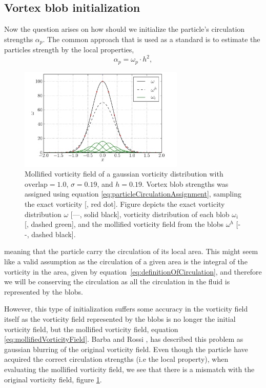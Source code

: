 \subsection{Vortex blob initialization}
\label{subsec:vortexBlobInitialization}
Now the question arises on how should we initialize the particle's circulation strengths $\alpha_p$. The common approach that is used as a standard is to estimate the particles strength by the local properties,
	\begin{equation}
	\alpha_p = \omega_p\cdot h^2,
	\label{eq:particleCirculationAssignment}
	\end{equation}

	\begin{figure}[!b]
	\centering
	\includegraphics[width=0.7\textwidth]{figures/lagrangian/particleInitialization.pdf}
	\caption{Mollified vorticity field of a gaussian vorticity distribution with $\mathrm{overlap}=1.0$, $\sigma=0.19$, and $h=0.19$. Vortex blob strengths was assigned using equation \ref{eq:particleCirculationAssignment}, sampling the exact vorticity [{\color{plotRed}{$\bullet$}}, red dot]. Figure depicts the exact vorticity distribution $\omega$ [---, solid black], vorticity distribution of each blob $\omega_i$ [{\color{darkgreen}{---}}, dashed green], and the mollified vorticity field from the blobs $\omega^h$ [- -, dashed black].  }
	\label{fig:particleInitialization}
	\end{figure}

meaning that the particle carry the circulation of its local area. This might seem like a valid assumption as the circulation of a given area is the integral of the vorticity in the area, given by equation\ \ref{eq:definitionOfCirculation}, and therefore we will be conserving the circulation as all the circulation in the fluid is represented by the blobs.

However, this type of initialization suffers some accuracy in the vorticity field itself as the vorticity field represented by the blobs is no longer the initial vorticity field, but the mollified vorticity field, equation \ref{eq:mollifiedVorticityField}. Barba and Rossi \cite{Barba2010a}, has described this problem as gaussian blurring of the original vorticity field. Even though the particle have acquired the correct circulation strengths (i.e the local property), when evaluating the mollified vorticity field, we see that there is a mismatch with the original vorticity field, figure \ref{fig:particleInitialization}. 

